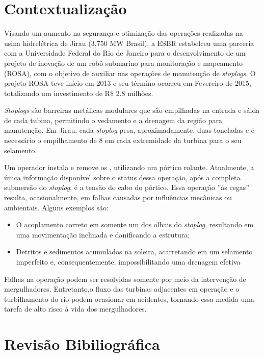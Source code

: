 \section{Contextualização}
Visando um aumento na segurança e otimização das operações realizadas na usina 
hidrelétrica de Jirau (3,750 MW Brasil), a ESBR estabelceu uma parceria com a 
Universidade Federal do Rio de Janeiro para o desenvolvimento de um projeto de 
inovação de um robô submarino para monitoração e mapeamento (ROSA), com o
objetivo de auxiliar nas operações de manutenção de \textit{stoplogs}. O projeto
ROSA teve início em 2013 e seu término ocorreu em Fevereiro de 2015, totalizando
um investimento de R\$ 2.8 milhões.

\textit{Stoplogs} são barreiras metálicas modulares que são empilhadas na
entrada e sáida de cada tubina, permitindo o vedamento e a drenagem da
região para manutenção. Em Jirau, cada \textit{stoplog} pesa, aproximadamente,
duas toneladas e é necessário o empilhamento de 8  em cada extremidade
da turbina para o seu selamento.

Um operador instala e remove os , utilizando um pórtico
rolante. Atualmente, a única informação disponível sobre o status dessa
operação, após a completa submersão do \textit{stoplog}, é a tensão do cabo do
pórtico. Essa operação ''ás cegas'' resulta, ocasionalmente, em falhas causadas 
por influências mecânicas ou ambientais. Alguns exemplos são:

\begin{itemize}
  \item O acoplamento correto em somente um dos olhais do \textit{stoplog},
  resultando em uma movimentação inclinada e danificando a estrutura;
  \item Detritos e sedimentos acumulados na soleira, acarretando em um selamento
  imperfeito e, consequentemente, impossibilitando uma drenagem efetiva
\end{itemize}

Falhas na operação podem ser resolvidas somente por meio da intervenção de
mergulhadores. Entretanto,o fluxo das turbinas adjacentes em operação e o
turbilhamento do rio podem ocasionar em acidentes, tornando essa medida uma 
tarefa de alto risco à vida dos mergulhadores.

\section{Revisão Bibiliográfica}

